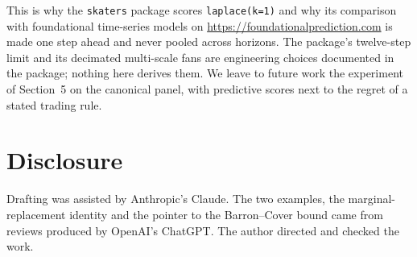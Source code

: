 \documentclass[11pt]{article}
\begin{document}
This is why the \texttt{skaters} package scores \texttt{laplace(k=1)} and why its comparison with foundational time-series models on \url{https://foundationalprediction.com} is made one step ahead and never pooled across horizons. The package's twelve-step limit and its decimated multi-scale fans are engineering choices documented in the package; nothing here derives them. We leave to future work the experiment of Section~5 on the canonical panel, with predictive scores next to the regret of a stated trading rule.

\section*{Disclosure}

Drafting was assisted by Anthropic's Claude. The two examples, the marginal-replacement identity and the pointer to the Barron--Cover bound came from reviews produced by OpenAI's ChatGPT. The author directed and checked the work.



\end{document}
